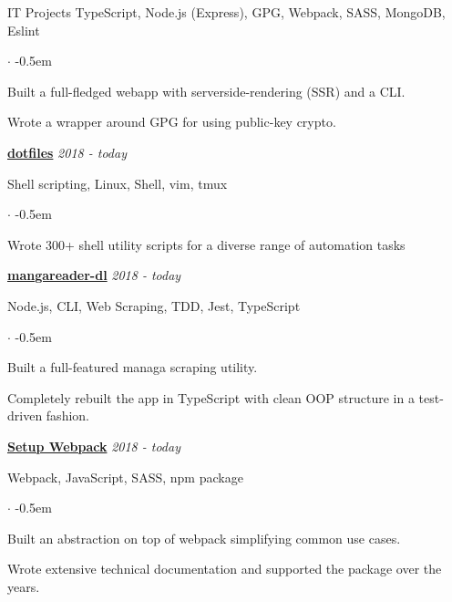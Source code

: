 \documentclass{cv}
\begin{document}
\begin{rSection}{IT Projects}
  TypeScript, Node.js (Express), GPG, Webpack, SASS, MongoDB, Eslint
  \begin{list}{$\cdot$}{}
  \itemsep -0.5em \vspace{-0.5em}
    \smallskip
  \item Built a full-fledged webapp with serverside-rendering (SSR) and a CLI.
  \item Wrote a wrapper around GPG for using public-key crypto.
  \end{list}

  \textbf{\href{https://github.com/jneidel/dotfiles}{dotfiles}}
  \hfill
  {\em 2018 - today}

  Shell scripting, Linux, Shell, vim, tmux
  \begin{list}{$\cdot$}{}
  \itemsep -0.5em \vspace{-0.5em}
    \smallskip
  \item Wrote 300+ shell utility scripts for a diverse range of automation tasks
  \end{list}

  \textbf{\href{https://github.com/jneidel/mangareader-dl}{mangareader-dl}}
  \hfill
  {\em 2018 - today}

  Node.js, CLI, Web Scraping, TDD, Jest, TypeScript
  \begin{list}{$\cdot$}{}
  \itemsep -0.5em \vspace{-0.5em}
    \smallskip
  \item Built a full-featured managa scraping utility.
  \item Completely rebuilt the app in TypeScript with clean OOP structure in a test-driven fashion.
  \end{list}

  \textbf{\href{https://github.com/jneidel/setup-webpack}{Setup Webpack}}
  \hfill
  {\em 2018 - today}

  Webpack, JavaScript, SASS, npm package
  \begin{list}{$\cdot$}{}
  \itemsep -0.5em \vspace{-0.5em}
    \smallskip
  \item Built an abstraction on top of webpack simplifying common use cases.
  \item Wrote extensive technical documentation and supported the package over the years.
  \end{list}

\end{rSection}
\end{document}
